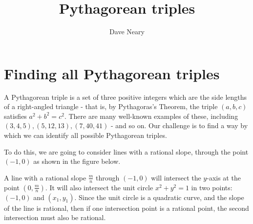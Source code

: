 \documentclass{article}
\begin{document}
\title{Pythagorean triples}
\author{Dave Neary}

\maketitle

\section{Finding all Pythagorean triples}

A Pythagorean triple is a set of three positive integers which 
are the side lengths of a right-angled triangle - that is, by
Pythagoras's Theorem, the triple $(a,b,c)$ satisfies 
$a^2 + b^2 = c^2$. There are many well-known examples of these,
including $(3,4,5), (5,12,13), (7,40,41)$ - and so on. Our challenge
is to find a way by which we can identify all possible Pythagorean
triples.

To do this, we are going to consider lines with a rational slope, through the
point $(-1,0)$ as shown in the figure below.


A line with a rational slope $\frac{m}{n}$ through $(-1,0)$ will intersect 
the $y$-axis at the point $(0,\frac{m}{n})$. It will also intersect the
unit circle $x^2 + y^2 = 1$ in two points: $(-1,0)$ and $(x_1,y_1)$. Since
the unit circle is a quadratic curve, and the slope of the line is
rational, then if one intersection point is a rational point, the second
intersection must also be rational.
\end{document}
